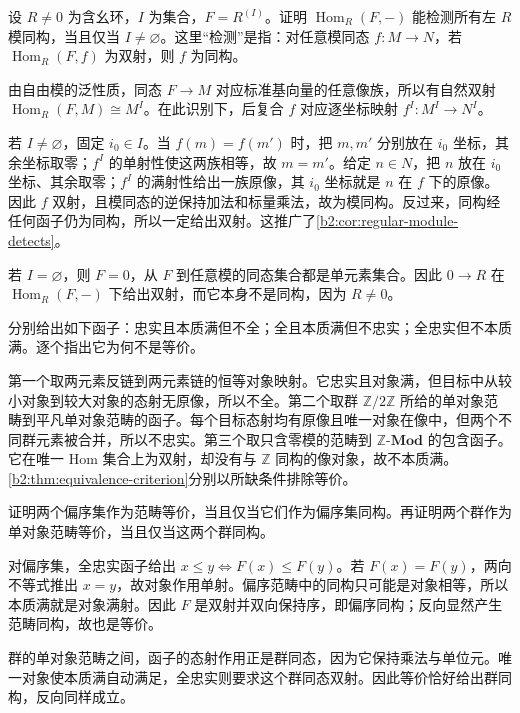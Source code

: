 \begin{exercise}\label{b2:ex:05-regular-module-detects}
	设 \(R\ne0\) 为含幺环，\(I\) 为集合，\(F=R^{(I)}\)。证明 \(\operatorname{Hom}_R(F,-)\) 能检测所有左 \(R\) 模同构，当且仅当 \(I\ne\varnothing\)。这里“检测”是指：对任意模同态 \(f:M\rightarrow N\)，若 \(\operatorname{Hom}_R(F,f)\) 为双射，则 \(f\) 为同构。
\end{exercise}
\begin{solution}
	由自由模的泛性质，同态 \(F\rightarrow M\) 对应标准基向量的任意像族，所以有自然双射 \(\operatorname{Hom}_R(F,M)\cong M^I\)。在此识别下，后复合 \(f\) 对应逐坐标映射 \(f^I:M^I\rightarrow N^I\)。

	若 \(I\ne\varnothing\)，固定 \(i_0\in I\)。当 \(f(m)=f(m')\) 时，把 \(m,m'\) 分别放在 \(i_0\) 坐标，其余坐标取零；\(f^I\) 的单射性使这两族相等，故 \(m=m'\)。给定 \(n\in N\)，把 \(n\) 放在 \(i_0\) 坐标、其余取零；\(f^I\) 的满射性给出一族原像，其 \(i_0\) 坐标就是 \(n\) 在 \(f\) 下的原像。因此 \(f\) 双射，且模同态的逆保持加法和标量乘法，故为模同构。反过来，同构经任何函子仍为同构，所以一定给出双射。这推广了\cref{b2:cor:regular-module-detects}。

	若 \(I=\varnothing\)，则 \(F=0\)，从 \(F\) 到任意模的同态集合都是单元素集合。因此 \(0\rightarrow R\) 在 \(\operatorname{Hom}_R(F,-)\) 下给出双射，而它本身不是同构，因为 \(R\ne0\)。
\end{solution}

\begin{exercise}\label{b2:ex:05-equivalence-hypotheses}
	分别给出如下函子：忠实且本质满但不全；全且本质满但不忠实；全忠实但不本质满。逐个指出它为何不是等价。
\end{exercise}
\begin{solution}
	第一个取两元素反链到两元素链的恒等对象映射。它忠实且对象满，但目标中从较小对象到较大对象的态射无原像，所以不全。第二个取群 \(\mathbb Z/2\mathbb Z\) 所给的单对象范畴到平凡单对象范畴的函子。每个目标态射均有原像且唯一对象在像中，但两个不同群元素被合并，所以不忠实。第三个取只含零模的范畴到 \(\mathbb Z\text{-}\mathbf{Mod}\) 的包含函子。它在唯一 Hom 集合上为双射，却没有与 \(\mathbb Z\) 同构的像对象，故不本质满。\cref{b2:thm:equivalence-criterion}分别以所缺条件排除等价。
\end{solution}

\begin{exercise}\label{b2:ex:05-poset-equivalence}
	证明两个偏序集作为范畴等价，当且仅当它们作为偏序集同构。再证明两个群作为单对象范畴等价，当且仅当这两个群同构。
\end{exercise}
\begin{solution}
	对偏序集，全忠实函子给出 \(x\le y\iff F(x)\le F(y)\)。若 \(F(x)=F(y)\)，两向不等式推出 \(x=y\)，故对象作用单射。偏序范畴中的同构只可能是对象相等，所以本质满就是对象满射。因此 \(F\) 是双射并双向保持序，即偏序同构；反向显然产生范畴同构，故也是等价。

	群的单对象范畴之间，函子的态射作用正是群同态，因为它保持乘法与单位元。唯一对象使本质满自动满足，全忠实则要求这个群同态双射。因此等价恰好给出群同构，反向同样成立。
\end{solution}

